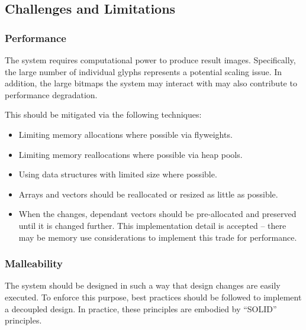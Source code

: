 \subsection{Challenges and Limitations}
\subsubsection{Performance}
The system requires computational power to produce result images.
Specifically, the large number of individual glyphs represents a potential scaling issue.
In addition, the large bitmaps the system may interact with may also contribute to performance degradation.

This should be mitigated via the following techniques:
\begin{itemize}
    \item Limiting memory allocations where possible via flyweights.
    \item Limiting memory reallocations where possible via heap pools.
    \item Using data structures with limited size where possible.
    \item Arrays and vectors should be reallocated or resized as little as possible.
    \item {
          When the  changes, dependant vectors should be pre-allocated and preserved until it is changed further.
          This implementation detail is accepted -- there may be memory use considerations to implement this trade for performance.
          }
\end{itemize}


\subsubsection{Malleability}
The system should be designed in such a way that design changes are easily executed.
To enforce this purpose, best practices should be followed to implement a decoupled design.
In practice, these principles are embodied by ``SOLID'' principles.

